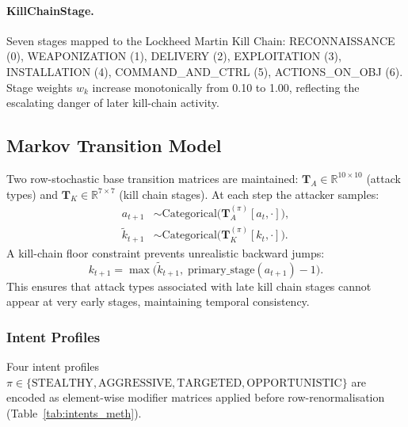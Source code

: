 \paragraph{KillChainStage.}
Seven stages mapped to the Lockheed Martin Kill Chain:
RECONNAISSANCE (0), WEAPONIZATION (1), DELIVERY (2), EXPLOITATION (3),
INSTALLATION (4), COMMAND\_AND\_CTRL (5), ACTIONS\_ON\_OBJ (6).
Stage weights $w_k$ increase monotonically from 0.10 to 1.00, reflecting
the escalating danger of later kill-chain activity.

\subsection{Markov Transition Model}
\label{sec:transition}

Two row-stochastic base transition matrices are maintained:
$\mathbf{T}_A \in \mathbb{R}^{10 \times 10}$ (attack types) and
$\mathbf{T}_K \in \mathbb{R}^{7 \times 7}$ (kill chain stages).
At each step the attacker samples:
%
\begin{align}
  a_{t+1} &\sim \text{Categorical}\bigl(\mathbf{T}_A^{(\pi)}[a_t, \cdot]\bigr), \\
  \tilde{k}_{t+1} &\sim \text{Categorical}\bigl(\mathbf{T}_K^{(\pi)}[k_t, \cdot]\bigr).
\end{align}
%
A kill-chain floor constraint prevents unrealistic backward jumps:
%
\begin{equation}
  k_{t+1} = \max\!\bigl(\tilde{k}_{t+1},\;
                          \text{primary\_stage}(a_{t+1}) - 1\bigr).
  \label{eq:floor}
\end{equation}
%
This ensures that attack types associated with late kill chain stages cannot
appear at very early stages, maintaining temporal consistency.

\subsubsection{Intent Profiles}
\label{sec:intents}

Four intent profiles $\pi \in \{\text{STEALTHY}, \text{AGGRESSIVE},
\text{TARGETED}, \text{OPPORTUNISTIC}\}$ are encoded as element-wise
modifier matrices applied before row-renormalisation
(Table~\ref{tab:intents_meth}).

